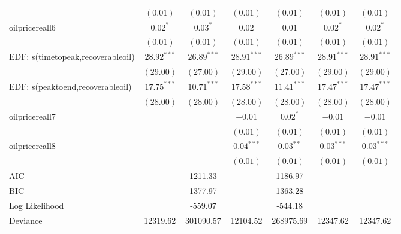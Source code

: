 \documentclass[11pt]{article}
\begin{document}
\begin{spacing}{1}
\begin{table}
\begin{center}
\begin{tabular}{l c c c c c c }
                                     & $(0.01)$      & $(0.01)$      & $(0.01)$      & $(0.01)$      & $(0.01)$      & $(0.01)$      \\
oilpricereall6                    & $0.02^{*}$    & $0.03^{*}$    & $0.02$        & $0.01$        & $0.02^{*}$    & $0.02^{*}$    \\
                                     & $(0.01)$      & $(0.01)$      & $(0.01)$      & $(0.01)$      & $(0.01)$      & $(0.01)$      \\
EDF: s(timetopeak,recoverableoil) & $28.92^{***}$ & $26.89^{***}$ & $28.91^{***}$ & $26.89^{***}$ & $28.91^{***}$ & $28.91^{***}$ \\
                                     & $(29.00)$     & $(27.00)$     & $(29.00)$     & $(27.00)$     & $(29.00)$     & $(29.00)$     \\
EDF: s(peaktoend,recoverableoil)  & $17.75^{***}$ & $10.71^{***}$ & $17.58^{***}$ & $11.41^{***}$ & $17.47^{***}$ & $17.47^{***}$ \\
                                     & $(28.00)$     & $(28.00)$     & $(28.00)$     & $(28.00)$     & $(28.00)$     & $(28.00)$     \\
oilpricereall7                    &               &               & $-0.01$       & $0.02^{*}$    & $-0.01$       & $-0.01$       \\
                                     &               &               & $(0.01)$      & $(0.01)$      & $(0.01)$      & $(0.01)$      \\
oilpricereall8                    &               &               & $0.04^{***}$  & $0.03^{**}$   & $0.03^{***}$  & $0.03^{***}$  \\
                                     &               &               & $(0.01)$      & $(0.01)$      & $(0.01)$      & $(0.01)$      \\
\hline
AIC                                  &               & 1211.33       &               & 1186.97       &               &               \\
BIC                                  &               & 1377.97       &               & 1363.28       &               &               \\
Log Likelihood                       &               & -559.07       &               & -544.18       &               &               \\
Deviance                             & 12319.62      & 301090.57     & 12104.52      & 268975.69     & 12347.62      & 12347.62      \\

\end{tabular}
\end{center}
\end{table}
\end{spacing}
\end{document}
